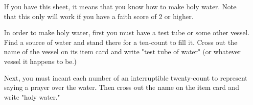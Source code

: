 \documentclass[green]{guildcamp4}
\begin{document}
\name{\gHoly{}}

If you have this sheet, it means that you know how to make holy water. Note that this only will work if you have a faith score of 2 or higher.

In order to make holy water, first you must have a test tube or some other vessel. Find a source of water and stand there for a ten-count to fill it. Cross out the name of the vessel on its item card and write "test tube of water" (or whatever vessel it happens to be.)

Next, you must incant each number of an interruptible twenty-count to represent saying a prayer over the water. Then cross out the name on the item card and write "holy water."
\end{document}
